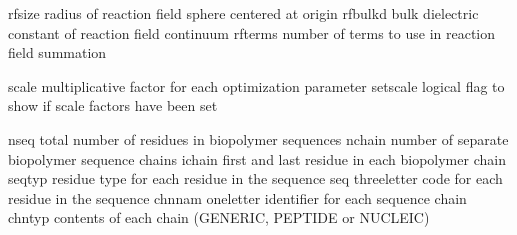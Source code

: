 \documentclass[letterpaper,11pt,english]{sphinxmanual}
\begin{document}

\begin{sphinxVerbatim}[commandchars=\\\{\}]
rfsize          radius of reaction field sphere centered at origin
rfbulkd         bulk dielectric constant of reaction field continuum
rfterms         number of terms to use in reaction field summation
\end{sphinxVerbatim}


\begin{sphinxVerbatim}[commandchars=\\\{\}]
scale           multiplicative factor for each optimization parameter
set\PYGZus{}scale       logical flag to show if scale factors have been set
\end{sphinxVerbatim}


\begin{sphinxVerbatim}[commandchars=\\\{\}]
nseq            total number of residues in biopolymer sequences
nchain          number of separate biopolymer sequence chains
ichain          first and last residue in each biopolymer chain
seqtyp          residue type for each residue in the sequence
seq             three\PYGZhy{}letter code for each residue in the sequence
chnnam          one\PYGZhy{}letter identifier for each sequence chain
chntyp          contents of each chain (GENERIC, PEPTIDE or NUCLEIC)
\end{sphinxVerbatim}

\end{document}
